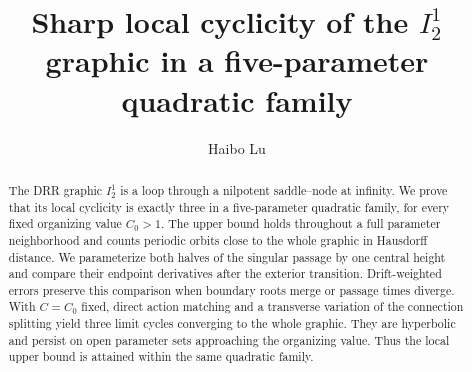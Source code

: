 \documentclass[11pt,reqno]{amsart}
\title[Sharp local cyclicity of the $I_2^1$ graphic]
  {Sharp local cyclicity of the $I_2^1$ graphic in a five-parameter quadratic family}
\author{Haibo Lu}
\date{}
\numberwithin{equation}{section}
\theoremstyle{definition}
\begin{document}
\begin{abstract}
The DRR graphic $I_2^1$ is a loop through a nilpotent saddle--node at
infinity. We prove that its local cyclicity is exactly three in a
five-parameter quadratic family, for every fixed organizing value
$C_0>1$. The upper bound holds throughout a full parameter neighborhood
and counts periodic orbits close to the whole graphic in Hausdorff distance.
We parameterize both halves of the singular passage by one central height
and compare their endpoint derivatives after the exterior transition.
Drift-weighted errors preserve this comparison when boundary roots merge
or passage times diverge. With $C=C_0$ fixed, direct action matching and a
transverse variation of the connection splitting yield three limit cycles
converging to the whole graphic. They are hyperbolic and persist on open
parameter sets approaching the organizing value. Thus the local upper
bound is attained within the same quadratic family.
\end{abstract}
\maketitle
\setcounter{tocdepth}{1}
\tableofcontents




























\end{document}
